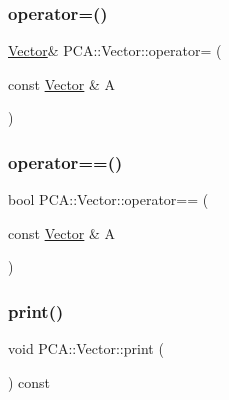 \hypertarget{class_p_c_a_1_1_vector_ac93d124518b0f5e39dd1a0973dddc958}{}\label{class_p_c_a_1_1_vector_ac93d124518b0f5e39dd1a0973dddc958} 
\subsubsection{\texorpdfstring{operator=()}{operator=()}}
{\footnotesize\ttfamily \hyperlink{class_p_c_a_1_1_vector}{Vector}\& P\+C\+A\+::\+Vector\+::operator= (\begin{DoxyParamCaption}\item[{const \hyperlink{class_p_c_a_1_1_vector}{Vector} \&}]{A }\end{DoxyParamCaption})\hspace{0.3cm}{\ttfamily [inline]}}

\hypertarget{class_p_c_a_1_1_vector_ae7a1abe13c8313d717b7bdb66934e92b}{}\label{class_p_c_a_1_1_vector_ae7a1abe13c8313d717b7bdb66934e92b} 
\subsubsection{\texorpdfstring{operator==()}{operator==()}}
{\footnotesize\ttfamily bool P\+C\+A\+::\+Vector\+::operator== (\begin{DoxyParamCaption}\item[{const \hyperlink{class_p_c_a_1_1_vector}{Vector} \&}]{A }\end{DoxyParamCaption})\hspace{0.3cm}{\ttfamily [inline]}}

\hypertarget{class_p_c_a_1_1_vector_a6411d63770d6d711c5c854e21ca1776e}{}\label{class_p_c_a_1_1_vector_a6411d63770d6d711c5c854e21ca1776e} 
\subsubsection{\texorpdfstring{print()}{print()}}
{\footnotesize\ttfamily void P\+C\+A\+::\+Vector\+::print (\begin{DoxyParamCaption}{ }\end{DoxyParamCaption}) const}



